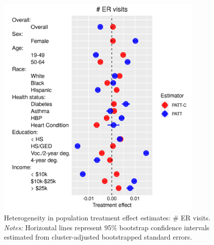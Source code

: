 \documentclass[hidelinks,12pt]{article}
\begin{document}
\begin{appendices}
\begin{figure}[htbp]
	\begin{center}
		\includegraphics[width = 0.9\textwidth]{num-visit-plot.png}
		\caption{Heterogeneity in population treatment effect estimates: $\#$ ER visits. \emph{Notes:} Horizontal lines represent 95\% bootstrap confidence intervals estimated from cluster-adjusted bootstrapped standard errors.\label{fig:num-visit-plot}}
	\end{center}
\end{figure}


\end{appendices}
\end{document}
